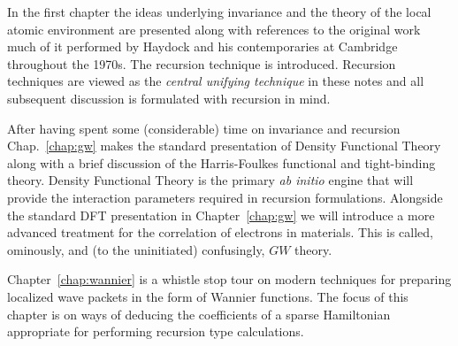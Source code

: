 In the first chapter the ideas underlying invariance and the 
theory of the local atomic environment are presented along with references
to the original work much of it performed by Haydock and his contemporaries at Cambridge 
throughout the 1970s. The recursion technique is introduced. 
Recursion techniques are viewed as the \textit{central unifying technique} in these
notes and all subsequent discussion is formulated with recursion in mind.

After having spent some (considerable) time on invariance and recursion
Chap.~\ref{chap:gw} makes the standard presentation of Density Functional Theory along 
with a brief discussion of the Harris-Foulkes functional and tight-binding theory. 
Density Functional Theory is the primary {\it ab initio} engine that will 
provide the interaction parameters required in recursion formulations.
Alongside the standard DFT presentation in Chapter~\ref{chap:gw} we will
introduce a more advanced treatment for the correlation of electrons in materials.
This is called, ominously, and (to the uninitiated) confusingly, $GW$ theory.

Chapter~\ref{chap:wannier} is a whistle stop tour 
on modern techniques for preparing localized wave packets in the 
form of Wannier functions. The focus of this chapter is on 
ways of deducing the coefficients of a sparse Hamiltonian
appropriate for performing recursion type calculations.




